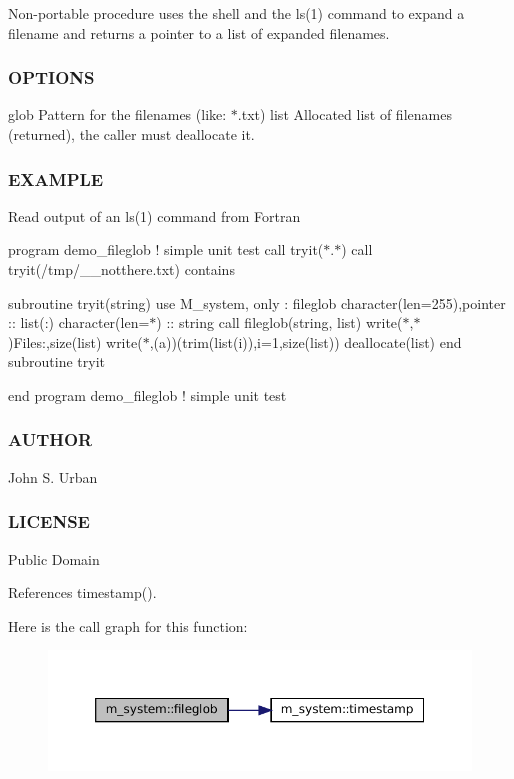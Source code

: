 Non-\/portable procedure uses the shell and the ls(1) command to expand a filename and returns a pointer to a list of expanded filenames.

\subsubsection*{O\+P\+T\+I\+O\+NS}

glob Pattern for the filenames (like\+: $\ast$.txt) list Allocated list of filenames (returned), the caller must deallocate it.

\subsubsection*{E\+X\+A\+M\+P\+LE}

Read output of an ls(1) command from Fortran

program demo\+\_\+fileglob ! simple unit test call tryit(\textquotesingle{}$\ast$.$\ast$\textquotesingle{}) call tryit(\textquotesingle{}/tmp/\+\_\+\+\_\+notthere.txt\textquotesingle{}) contains

subroutine tryit(string) use M\+\_\+system, only \+: fileglob character(len=255),pointer \+:\+: list(\+:) character(len=$\ast$) \+:\+: string call fileglob(string, list) write($\ast$,$\ast$)\textquotesingle{}Files\+:\textquotesingle{},size(list) write($\ast$,\textquotesingle{}(a)\textquotesingle{})(trim(list(i)),i=1,size(list)) deallocate(list) end subroutine tryit

end program demo\+\_\+fileglob ! simple unit test

\subsubsection*{A\+U\+T\+H\+OR}

John S. Urban \subsubsection*{L\+I\+C\+E\+N\+SE}

Public Domain 

References timestamp().

Here is the call graph for this function\+:\nopagebreak
\begin{figure}[H]
\begin{center}
\leavevmode
\includegraphics[width=350pt]{namespacem__system_a79656f76ad75168302e0d770052e901e_cgraph}
\end{center}
\end{figure}
\mbox{\label{namespacem__system_a0fccb69d0a56044b05e85b8df9f90aea}} 
